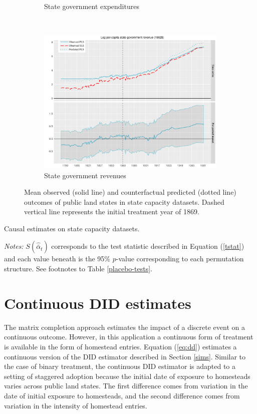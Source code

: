 \documentclass[12pt]{article}
\begin{document}
\begin{figure}[htbp]
\begin{subfigure}[t]{0.48\textwidth}
		\caption{State government expenditures}
	\end{subfigure}
	~ 
	\begin{subfigure}[t]{0.48\textwidth}
		\centering
		\includegraphics[width=\textwidth]{plots/mc-rev-pc.png}
		\caption{State government revenues}
	\end{subfigure}
	\caption{Mean observed (solid line) and counterfactual predicted (dotted line) outcomes of public land states in state capacity datasets. Dashed vertical line represents the initial treatment year of 1869. \label{mc-estimates}} 
\end{figure}

\begin{table}[htbp]
	\captionsetup{font=normalsize}
	\caption{Causal estimates on state capacity datasets.\label{mc-estimates}}
	\begin{center}
		
	\end{center}
\footnotesize{\emph{Notes:} $S (\hat{\bar{\alpha}}_{t})$ corresponds to the test statistic described in Equation (\ref{tstat}) and each value beneath is the 95\% $p$-value corresponding to each permutation structure. See footnotes to Table \ref{placebo-tests}.}
\end{table}

\section{Continuous DID estimates} \label{DID}

The matrix completion approach estimates the impact of a discrete event on a continuous outcome. However, in this application a continuous form of treatment is available in the form of homestead entries. Equation (\ref{eq:dd}) estimates a continuous version of the DID estimator described in Section \ref{sims}. Similar to the case of binary treatment, the continuous DID estimator is adapted to a setting of staggered adoption because the initial date of exposure to homesteads varies across public land states. The first difference comes from variation in the date of initial exposure to homesteads, and the second difference comes from variation in the intensity of homestead entries.
\end{document}
